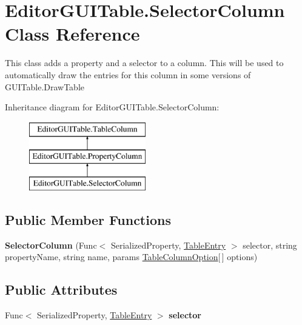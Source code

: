 \hypertarget{class_editor_g_u_i_table_1_1_selector_column}{}\section{Editor\+G\+U\+I\+Table.\+Selector\+Column Class Reference}
\label{class_editor_g_u_i_table_1_1_selector_column}


This class adds a property and a selector to a column. This will be used to automatically draw the entries for this column in some versions of G\+U\+I\+Table.\+Draw\+Table  


Inheritance diagram for Editor\+G\+U\+I\+Table.\+Selector\+Column\+:\begin{figure}[H]
\begin{center}
\leavevmode
\includegraphics[height=3.000000cm]{class_editor_g_u_i_table_1_1_selector_column}
\end{center}
\end{figure}
\subsection*{Public Member Functions}
\begin{DoxyCompactItemize}
\item 
\mbox{\label{class_editor_g_u_i_table_1_1_selector_column_a86905f52829303fc2322dc71a362941e}} 
{\bfseries Selector\+Column} (Func$<$ Serialized\+Property, \mbox{\hyperlink{class_editor_g_u_i_table_1_1_table_entry}{Table\+Entry}} $>$ selector, string property\+Name, string name, params \mbox{\hyperlink{class_table_column_option}{Table\+Column\+Option}}\mbox{[}$\,$\mbox{]} options)
\end{DoxyCompactItemize}
\subsection*{Public Attributes}
\begin{DoxyCompactItemize}
\item 
\mbox{\label{class_editor_g_u_i_table_1_1_selector_column_a5c4dffe1ceb563f968a0041b0d433ec6}} 
Func$<$ Serialized\+Property, \mbox{\hyperlink{class_editor_g_u_i_table_1_1_table_entry}{Table\+Entry}} $>$ {\bfseries selector}
\end{DoxyCompactItemize}
